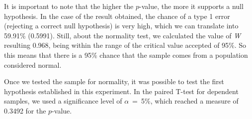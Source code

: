 It is important to note that the higher the $p$-value, the more it supports a null hypothesis.
In the case of the result obtained, the chance of a type 1 error (rejecting a correct null hypothesis) is very high, which we can translate into 59.91\% (0.5991).
Still, about the normality test, we calculated the value of \textit{W} resulting 0.968, being within the range of the critical value accepted of 95\%.
So this means that there is a 95\% chance that the sample comes from a  population considered normal.

Once we tested the sample for normality, it was possible to test the first hypothesis established in this experiment.
In the paired T-test for dependent samples, we used a significance level of $\alpha$~=~5\%, which reached a measure of 0.3492 for the $p$-value.

